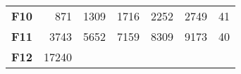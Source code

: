\documentclass[12pt,a4paper]{article}
\begin{document}
\begin{longtable}[c]{@{}crrrrrr@{}}
\begin{minipage}[t]{0.11\columnwidth}
\textbf{F10}
\strut\end{minipage} &
\begin{minipage}[t]{0.08\columnwidth}\raggedleft\strut
871
\strut\end{minipage} &
\begin{minipage}[t]{0.08\columnwidth}\raggedleft\strut
1309
\strut\end{minipage} &
\begin{minipage}[t]{0.09\columnwidth}\raggedleft\strut
1716
\strut\end{minipage} &
\begin{minipage}[t]{0.10\columnwidth}\raggedleft\strut
2252
\strut\end{minipage} &
\begin{minipage}[t]{0.11\columnwidth}\raggedleft\strut
2749
\strut\end{minipage} &
\begin{minipage}[t]{0.07\columnwidth}\raggedleft\strut
41
\strut\end{minipage}\tabularnewline
\begin{minipage}[t]{0.11\columnwidth}\centering\strut
\textbf{F11}
\strut\end{minipage} &
\begin{minipage}[t]{0.08\columnwidth}\raggedleft\strut
3743
\strut\end{minipage} &
\begin{minipage}[t]{0.08\columnwidth}\raggedleft\strut
5652
\strut\end{minipage} &
\begin{minipage}[t]{0.09\columnwidth}\raggedleft\strut
7159
\strut\end{minipage} &
\begin{minipage}[t]{0.10\columnwidth}\raggedleft\strut
8309
\strut\end{minipage} &
\begin{minipage}[t]{0.11\columnwidth}\raggedleft\strut
9173
\strut\end{minipage} &
\begin{minipage}[t]{0.07\columnwidth}\raggedleft\strut
40
\strut\end{minipage}\tabularnewline
\begin{minipage}[t]{0.11\columnwidth}\centering\strut
\textbf{F12}
\strut\end{minipage} &
\begin{minipage}[t]{0.08\columnwidth}\raggedleft\strut
17240
\strut\end{minipage} &
\begin{minipage}[t]{0.08\columnwidth}\raggedleft\strut

\end{minipage}
\end{longtable}
\end{document}
